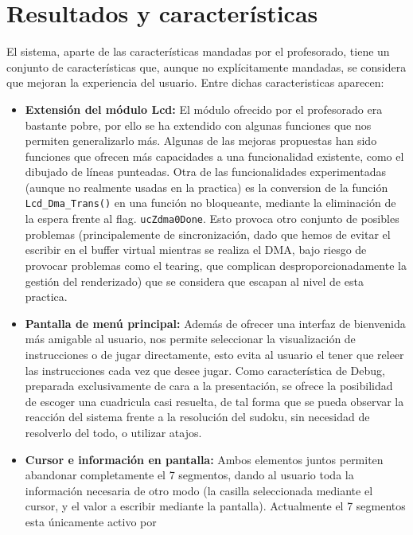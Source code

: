 \documentclass[12pt,letterpaper]{article}
\begin{document}
\section{Resultados y características}
\label{subsec:resultados-caracteristicas}
El sistema, aparte de las características mandadas por el profesorado,
tiene un conjunto de características que, aunque no explícitamente
mandadas, se considera que mejoran la experiencia del usuario. Entre
dichas caracteristicas aparecen:
\begin{itemize}
  \item \textbf{Extensión del módulo Lcd:} El módulo ofrecido por el
    profesorado era bastante pobre, por ello se ha extendido con
    algunas funciones que nos permiten generalizarlo más. Algunas de
    las mejoras propuestas han sido funciones que ofrecen más
    capacidades a una funcionalidad existente, como el dibujado de
    líneas punteadas. Otra de las funcionalidades experimentadas
    (aunque no realmente usadas en la practica) es la conversion de la
    función \texttt{Lcd\_Dma\_Trans()} en una función no bloqueante,
    mediante la eliminación de la espera frente al flag.
    \texttt{ucZdma0Done}. Esto provoca otro conjunto de posibles
    problemas (principalemente de sincronización, dado que hemos de
    evitar el escribir en el buffer virtual mientras se realiza el
    DMA, bajo riesgo de provocar problemas como el tearing, que
    complican desproporcionadamente la gestión del renderizado) que se
    considera que escapan al nivel de esta practica.
  \item \textbf{Pantalla de menú principal:} Además de ofrecer una
    interfaz de bienvenida más amigable al usuario, nos permite
    seleccionar la visualización de instrucciones o de jugar
    directamente, esto evita al usuario el tener que releer las
    instrucciones cada vez que desee jugar. Como característica de
    Debug, preparada exclusivamente de cara a la presentación, se
    ofrece la posibilidad de escoger una cuadricula casi resuelta, de
    tal forma que se pueda observar la reacción del sistema frente a
    la resolución del sudoku, sin necesidad de resolverlo del todo, o
    utilizar atajos.
  \item \textbf{Cursor e información en pantalla:} Ambos elementos
    juntos permiten abandonar completamente el 7 segmentos, dando al
    usuario toda la información necesaria de otro modo (la casilla
    seleccionada mediante el cursor, y el valor a escribir mediante la
    pantalla). Actualmente el 7 segmentos esta únicamente activo por

\end{itemize}
\end{document}
